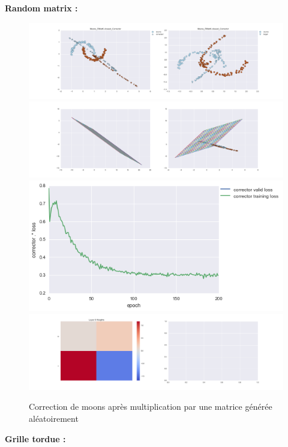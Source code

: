 {\Large \textbf{Random matrix :}}

\begin{figure}[H] %
\centering
\includegraphics[width=\linewidth]{fig/24-05-2016/moons/Moons_RMatK-closest_Corrector-DATA.png}
\includegraphics[width=\linewidth]{fig/24-05-2016/moons/Moons_RMatK-closest_Corrector-GridCheck.png}
\includegraphics[width=0.45\linewidth]{fig/24-05-2016/moons/Moons_RMatK-closest_Corrector-Learning_curve.png}
\includegraphics[width=\linewidth]{fig/24-05-2016/moons/Moons_RMatK-closest_Corrector-W.png}
\caption{Correction de moons après multiplication par une matrice générée aléatoirement}
\label{fig:recap-moons-RMat-exhaustive}
\end{figure}

{\Large \textbf{Grille tordue :}}

